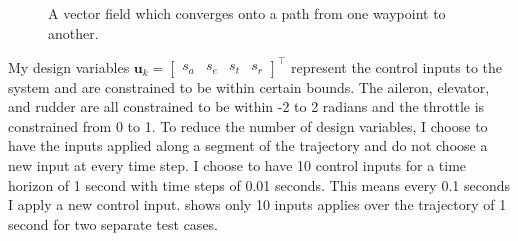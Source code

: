 \documentclass{article}
\begin{document}
\begin{figure}
	\centering
	\caption{A vector field which converges onto a path from one waypoint to another.}
\label{fig:vet_field}

\end{figure}

My design variables $\mathbf{u}_k =\begin{bmatrix}s_{a} & s_{e} & s_{t} & s_{r}\end{bmatrix}^{\top}$ represent the control inputs to the system and are constrained to be within certain bounds. The aileron, elevator, and rudder are all constrained to be within -2 to 2 radians and the throttle is constrained from 0 to 1. To reduce the number of design variables, I choose to have the inputs applied along a segment of the trajectory and do not choose a new input at every time step. I choose to have 10 control inputs for a time horizon of 1 second with time steps of 0.01 seconds. This means every 0.1 seconds I apply a new control input.  shows only 10 inputs applies over the trajectory of 1 second for two separate test cases.
\end{document}
